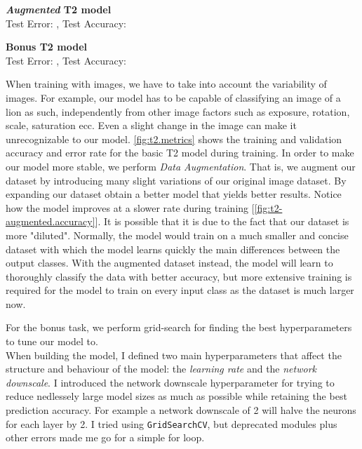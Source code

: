 \documentclass[tikz,14pt,fleqn]{article}
\begin{document}
\textbf{\textit{Augmented} T2 model}\\
Test Error: \textbf{}, Test Accuracy: \textbf{}

\textbf{Bonus T2 model}\\
Test Error: \textbf{}, Test Accuracy: \textbf{}

When training with images, we have to take into account the variability of images. For example, our model has to be capable of classifying an image of a lion as such, independently from other image factors such as exposure, rotation, scale, saturation ecc. Even a slight change in the image can make it unrecognizable to our model. \autoref{fig:t2.metrics} shows the training and validation accuracy and error rate for the basic T2 model during training. In order to make our model more stable, we perform \textit{Data Augmentation}. That is, we augment our dataset by introducing many slight variations of our original image dataset. By expanding our dataset obtain a better model that yields better results. Notice how the model improves at a slower rate during training [\autoref{fig:t2-augmented.accuracy}]. It is possible that it is due to the fact that our dataset is more "diluted". Normally, the model would train on a much smaller and concise dataset with which the model learns quickly the main differences between the output classes. With the augmented dataset instead, the model will learn to thoroughly classify the data with better accuracy, but more extensive training is required for the model to train on every input class as the dataset is much larger now.

For the bonus task, we perform grid-search for finding the best hyperparameters to tune our model to.\\
When building the model, I defined two main hyperparameters that affect the structure and behaviour of the model: the \textit{learning rate} 
and the \textit{network downscale}. I introduced the network downscale hyperparameter for trying to reduce nedlessely large model sizes as much as possible while retaining the best prediction accuracy. For example a network downscale of 2 will halve the neurons for each layer by 2. I tried using \verb|GridSearchCV|, but deprecated modules plus other errors made me go for a simple for loop.
\end{document}
